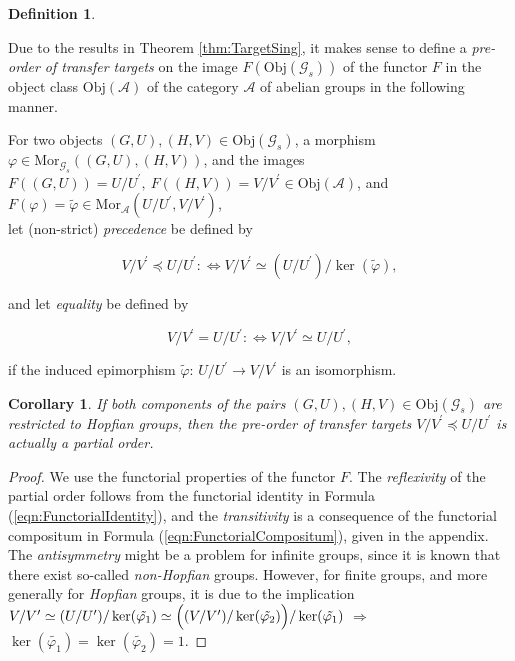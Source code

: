 \documentclass{amsart}
\newtheorem{corollary}{Corollary}[section]
\theoremstyle{definition}
\newtheorem{definition}{Definition}[section]
\numberwithin{equation}{section}
\begin{document}
\begin{definition}
\label{dfn:poTarget}

Due to the results in Theorem
\ref{thm:TargetSing},
it makes sense to define a \textit{pre-order of transfer targets}
on the image \(F(\mathrm{Obj}(\mathcal{G}_s))\) of the functor \(F\)
in the object class \(\mathrm{Obj}(\mathcal{A})\)
of the category \(\mathcal{A}\) of abelian groups
in the following manner.

For two objects \((G,U),(H,V)\in\mathrm{Obj}(\mathcal{G}_s)\),
a morphism \(\varphi\in\mathrm{Mor}_{\mathcal{G}_s}((G,U),(H,V))\),
and the images
\(F((G,U))=U/U^\prime,\ F((H,V))=V/V^\prime\in\mathrm{Obj}(\mathcal{A})\),
and \(F(\varphi)=\tilde{\varphi}\in\mathrm{Mor}_{\mathcal{A}}(U/U^\prime,V/V^\prime)\),\\
let (non-strict) \textit{precedence} be defined by

\begin{equation}
\label{eqn:TargetPrecedence}
V/V^\prime\preceq U/U^\prime
:\Longleftrightarrow
V/V^\prime\simeq (U/U^\prime)/\ker(\tilde{\varphi}),
\end{equation}

\noindent
and let \textit{equality} be defined by

\begin{equation}
\label{eqn:TargetEquality}
V/V^\prime=U/U^\prime
:\Longleftrightarrow
V/V^\prime\simeq U/U^\prime,
\end{equation}

\noindent
if the induced epimorphism
\(\tilde{\varphi}:\,U/U^\prime\to V/V^\prime\)
is an isomorphism.

\end{definition}


\begin{corollary}
\label{cor:poTarget}
If both components of the pairs \((G,U),(H,V)\in\mathrm{Obj}(\mathcal{G}_s)\)
are restricted to Hopfian groups,
then the pre-order of transfer targets
\(V/V^\prime\preceq U/U^\prime\) is actually a partial order.
\end{corollary}

\begin{proof}
We use the functorial properties of the functor \(F\).
The \textit{reflexivity} of the partial order follows from the functorial identity in Formula
(\ref{eqn:FunctorialIdentity}),
and the \textit{transitivity} is a consequence of the functorial compositum in Formula
(\ref{eqn:FunctorialCompositum}),
given in the appendix.
The \textit{antisymmetry} might be a problem for infinite groups,
since it is known that there exist so-called \textit{non-Hopfian} groups.
However, for finite groups, and more generally for \textit{Hopfian} groups,
it is due to the implication
\(V/V^\prime\simeq (U/U^\prime)/\ker(\tilde{\varphi_1})
\simeq\Bigl((V/V^\prime)/\ker(\tilde{\varphi_2})\Bigr)/\ker(\tilde{\varphi_1})\)
\(\Longrightarrow\)
\(\ker(\tilde{\varphi_1})=\ker(\tilde{\varphi_2})=1\).
\end{proof}
\end{document}
